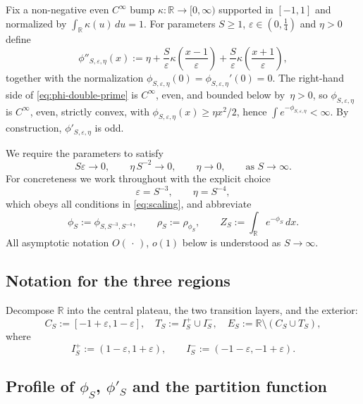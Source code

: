 \documentclass{article}
\theoremstyle{remark}
\begin{document}
Fix a non-negative even $C^\infty$ bump
$\kappa:\mathbb R\to[0,\infty)$ supported in $[-1,1]$ and normalized by
$\int_{\mathbb R}\kappa(u)\,du=1$. For parameters $S\ge 1$,
$\varepsilon\in(0,\tfrac14)$ and $\eta>0$ define
\begin{equation}\label{eq:phi-double-prime}
  \phi''_{S,\varepsilon,\eta}(x)
  :=\eta
  +\frac{S}{\varepsilon}\kappa\!\left(\frac{x-1}{\varepsilon}\right)
  +\frac{S}{\varepsilon}\kappa\!\left(\frac{x+1}{\varepsilon}\right),
\end{equation}
together with the normalization $\phi_{S,\varepsilon,\eta}(0)
=\phi_{S,\varepsilon,\eta}'(0)=0$. The right-hand side of
\eqref{eq:phi-double-prime} is $C^\infty$, even, and bounded below by~$\eta>0$,
so $\phi_{S,\varepsilon,\eta}$ is $C^\infty$, even, strictly convex, with
$\phi_{S,\varepsilon,\eta}(x)\ge\eta x^2/2$, hence
$\int e^{-\phi_{S,\varepsilon,\eta}}<\infty$. By construction,
$\phi'_{S,\varepsilon,\eta}$ is odd.

We require the parameters to satisfy
\begin{equation}\label{eq:scaling}
  S\varepsilon\to 0,\qquad \eta\,S^{-2}\to 0,\qquad \eta\to 0,
  \qquad\text{as }S\to\infty.
\end{equation}
For concreteness we work throughout with the explicit choice
\begin{equation}\label{eq:specific-choice}
  \varepsilon = S^{-3},\qquad \eta = S^{-4},
\end{equation}
which obeys all conditions in \eqref{eq:scaling}, and abbreviate
\[
  \phi_S:=\phi_{S,S^{-3},S^{-4}},\qquad
  \rho_S:=\rho_{\phi_S},\qquad
  Z_S:=\int_{\mathbb R}e^{-\phi_S}\,dx.
\]
All asymptotic notation $O(\,\cdot\,)$, $o(1)$ below is understood as
$S\to\infty$.

\subsection*{Notation for the three regions}

Decompose $\mathbb R$ into the central plateau, the two transition layers, and
the exterior:
\[
  C_S:=[-1+\varepsilon,1-\varepsilon],\quad
  T_S:=I_S^+\cup I_S^-,\quad
  E_S:=\mathbb R\setminus(C_S\cup T_S),
\]
where
\[
  I_S^+:=(1-\varepsilon,1+\varepsilon),\qquad I_S^-:=(-1-\varepsilon,-1+\varepsilon).
\]

\subsection*{Profile of $\phi_S$, $\phi'_S$ and the partition function}
\end{document}
